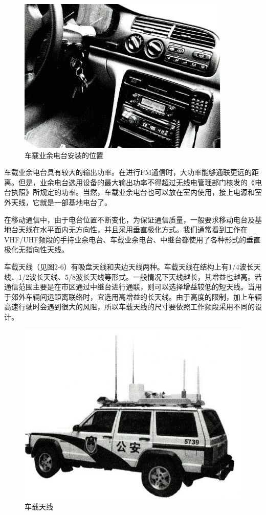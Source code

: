 \documentclass[12pt,UTF8]{ctexbook}
\begin{document}
\begin{figure}[htbp]
	\centering
	\includegraphics[width=0.7\linewidth]{22}
	\caption{车载业余电台安装的位置}
	\label{fig:1}
\end{figure}

车载业余电台具有较大的输出功率。在进行FM通信时，大功率能够通联更远的距离。但是，业余电台选用设备的最大输出功率不得超过无线电管理部门核发的《电台执照》所规定的功率。当然，车载业余电台也可以放在室内使用，接上电源和室外天线，它就是一部基地电台了。

在移动通信中，由于电台位置不断变化，为保证通信质量，一般要求移动电台及基地台天线在水平面内无方向性，并且采用垂直极化方式。我们通常看到工作在VHF/UHF频段的手持业余电台、车载业余电台、中继台都使用了各种形式的垂直极化无指向性天线。

车载天线（见图2-6）有吸盘天线和夹边天线两种。车载天线在结构上有1/4波长天线、1/2波长天线、5/8波长天线等形式。一般情况下天线越长，其增益也越高。若通信范围主要是在市区通过中继台进行通联，则可以选择增益较低的短天线。当用于郊外车辆间远距离联络时，宜选用高增益的长天线。由于高度的限制，加上车辆高速行驶时会遇到很大的风阻，所以车载天线的尺寸要依照工作频段采用不同的设计。

\begin{figure}[htbp]
	\centering
	\includegraphics[width=0.7\linewidth]{23}
	\caption{车载天线}
	\label{fig:1}
\end{figure}
\end{document}
